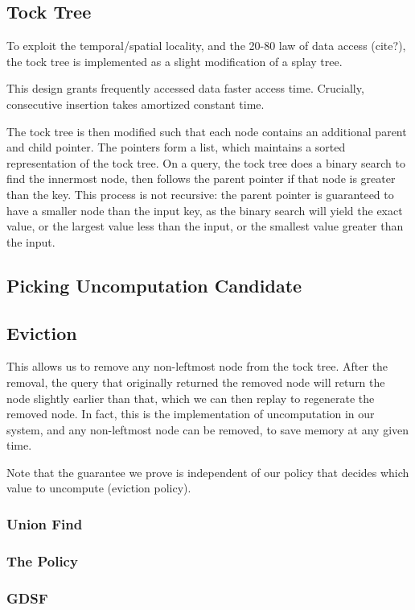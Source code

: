 \subsection{Tock Tree}
To exploit the temporal/spatial locality, and the 20-80 law of data access (cite?), the tock tree is implemented as a slight modification of a splay tree.

This design grants frequently accessed data faster access time. Crucially, consecutive insertion takes amortized constant time.

The tock tree is then modified such that each node contains an additional parent and child pointer. The pointers form a list, which maintains a sorted representation of the tock tree. On a query, the tock tree does a binary search to find the innermost node, then follows the parent pointer if that node is greater than the key. This process is not recursive: the parent pointer is guaranteed to have a smaller node than the input key, as the binary search will yield the exact value, or the largest value less than the input, or the smallest value greater than the input.
\subsection{Picking Uncomputation Candidate}
\subsection{Eviction}
This allows us to remove any non-leftmost node from the tock tree. After the removal, the query that originally returned the removed node will return the node slightly earlier than that, which we can then replay to regenerate the removed node. In fact, this is the implementation of uncomputation in our system, and any non-leftmost node can be removed, to save memory at any given time.

Note that the guarantee we prove is independent of our policy that decides which value to uncompute (eviction policy).
\subsubsection{Union Find}
\subsubsection{The Policy}
\subsubsection{GDSF}
